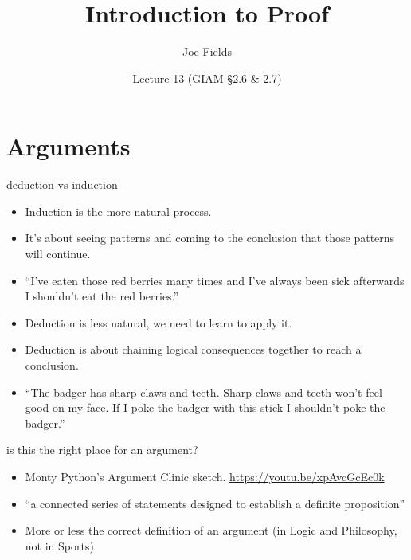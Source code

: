 \documentclass[landscape]{beamer}
\author{Joe Fields}
\title{Introduction to Proof}
\date{Lecture 13 (GIAM \S 2.6 \& 2.7)}
\institute[SCSU]{ {\tt fieldsj1@southernct.edu} }
\begin{document}
\begin{frame}[plain]
  \titlepage
\end{frame}

\section{Arguments}

\begin{frame}{deduction vs induction}
\begin{itemize}
\item Induction is the more natural process. \pause
\item It's about seeing patterns and coming to the conclusion that those patterns will continue. \pause
\item ``I've eaten those red berries many times and I've always been sick afterwards\textellipsis \pause \newline
I shouldn't eat the red berries.'' \pause
\item Deduction is less natural, we need to learn to apply it. \pause
\item Deduction is about chaining logical consequences together to reach a conclusion. \pause
\item ``The badger has sharp claws and teeth.  Sharp claws and teeth won't feel good on my face. If I poke the badger with this stick\textellipsis \pause \newline
I shouldn't poke the badger.''
\end{itemize}
\end{frame}

\begin{frame}{is this the right place for an argument?}
\begin{itemize}
\item Monty Python's Argument Clinic sketch. \pause \href{https://youtu.be/xpAvcGcEc0k}{https://youtu.be/xpAvcGcEc0k} \pause
\item ``a connected series of statements designed to establish a definite proposition'' \pause
\item More or less the correct definition of an argument (in Logic and Philosophy, not in Sports)
\end{itemize}
\end{frame}
\end{document}
